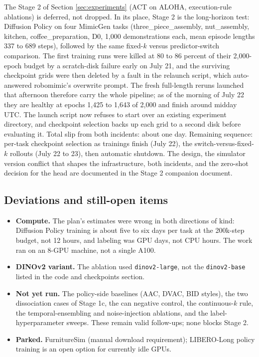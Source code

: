 \documentclass[11pt]{article}
\begin{document}
The Stage 2 of Section \ref{sec:experiments} (ACT on ALOHA, execution-rule
ablations) is deferred, not dropped. In its place, Stage 2 is the long-horizon
test: Diffusion Policy on four MimicGen tasks (three\_piece\_assembly,
nut\_assembly, kitchen, coffee\_preparation, D0, 1{,}000 demonstrations each,
mean episode lengths 337 to 689 steps), followed by the same fixed-$k$ versus
predictor-switch comparison. The first training runs were killed at 80 to 86
percent of their 2,000-epoch budget by a scratch-disk failure early on
July 21, and the surviving checkpoint grids were then deleted by a fault in
the relaunch script, which auto-answered robomimic's overwrite prompt. The
fresh full-length reruns launched that afternoon therefore carry the whole
pipeline; as of the morning of July 22 they are healthy at epochs 1,425 to
1,643 of 2,000 and finish around midday UTC. The launch script now refuses
to start over an existing experiment directory, and checkpoint selection
backs up each grid to a second disk before evaluating it. Total slip from
both incidents: about one day. Remaining sequence: per-task checkpoint
selection as trainings finish (July 22), the switch-versus-fixed-$k$
rollouts (July 22 to 23), then automatic shutdown. The design, the simulator
version conflict that shapes the infrastructure, both incidents, and the
zero-shot decision for the head are documented in the Stage 2 companion
document.

\subsection{Deviations and still-open items}

\begin{itemize}[leftmargin=2em]
  \item \textbf{Compute.} The plan's estimates were wrong in both directions
        of kind: Diffusion Policy training is about five to six days per task
        at the 200k-step budget, not 12 hours, and labeling was GPU days, not
        CPU hours. The work ran on an 8-GPU machine, not a single A100.
  \item \textbf{DINOv2 variant.} The ablation used \texttt{dinov2-large}, not
        the \texttt{dinov2-base} listed in the code and checkpoints section.
  \item \textbf{Not yet run.} The policy-side baselines (AAC, DVAC, BID
        styles), the two dissociation cases of Stage 1c, the can negative
        control, the continuous-$k$ rule, the temporal-ensembling and
        noise-injection ablations, and the label-hyperparameter sweeps. These
        remain valid follow-ups; none blocks Stage 2.
  \item \textbf{Parked.} FurnitureSim (manual download requirement);
        LIBERO-Long policy training is an open option for currently idle
        GPUs.
\end{itemize}
\end{document}
